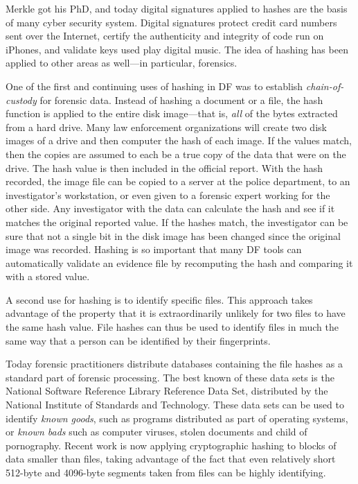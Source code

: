Merkle got his PhD, and today digital signatures applied to hashes are
the basis of many cyber security system. Digital signatures protect
credit card numbers sent over the Internet, certify the authenticity
and integrity of code run on iPhones, and validate keys used play
digital music. The idea of hashing has been applied to other areas as
well---in particular, forensics.

One of the first and continuing uses of hashing in DF was to establish
\emph{chain-of-custody} for forensic data. Instead of hashing a
document or a file, the hash function is applied to the entire disk
image---that is, \emph{all} of the bytes extracted from a hard
drive. Many law enforcement organizations will create two
disk images of a drive and then computer the hash of each image.  If the values match, then the
copies are assumed to each be a true copy of the data that were on the
drive. The hash value is then included in the official report. With
the hash recorded, the image file can be copied to a server at the
police department, to an investigator's workstation, or even given to
a forensic expert working for the other side. Any investigator with the
data can calculate the hash and see if it matches the original
reported value. If the hashes match, the investigator can be sure that
not a single bit in the disk image has been changed since the original
image was recorded. Hashing is so important that many DF tools can
automatically validate an evidence file by recomputing the hash and
comparing it with a stored value.

A second use for hashing is to identify specific
files. This approach takes advantage of the property that it is
extraordinarily unlikely for two files to have the same
hash value. File hashes can thus be used to identify files in much the
same way that a person can be identified by their fingerprints. 

Today forensic practitioners distribute databases containing the file
hashes as a standard part of forensic processing. The best known of these data
sets is the National Software Reference Library Reference Data Set,
distributed by the National Institute of Standards and
Technology\cite{nist-nsrl-rds-march2012}. These data sets can be used
to identify \emph{known goods}, such as programs distributed as part
of operating systems, or \emph{known bads} such as computer viruses,
stolen documents and child of pornography. Recent work is now
applying cryptographic hashing to blocks of data smaller than
files\cite{garfinkel:sector-id}, taking advantage of the fact that
even relatively short 512-byte and 4096-byte segments taken from
files can be highly identifying. 

